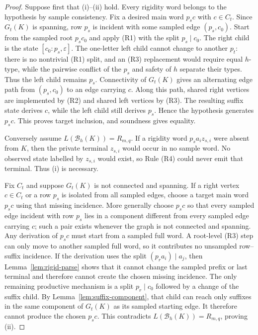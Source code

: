 \documentclass[11pt]{article}
\newcommand{\eps}{\varepsilon}
\newcommand{\B}{\mathcal B}
\begin{document}
\begin{proof}
Suppose first that (i)--(ii) hold.  Every rigidity word belongs to the
hypothesis by sample consistency.  Fix a desired main word $p_sc$ with
$c\in C_t$.  Since $G_t(K)$ is spanning, row $p_s$ is incident with some
sampled edge $(p_s,c_0)$.  Start from the sampled root $p_sc_0$ and apply
(R1) with the split $p_s\mid c_0$.  The right child is the state
$[c_0:p_s,\eps]$.  The one-letter left child cannot change to another $p_t$:
there is no nontrivial (R1) split, and an (R3) replacement would require equal
$h$-type, while the pairwise conflict of the $p_s$ and safety of $h$ separate
their types.  Thus the left child remains $p_s$.  Connectivity of $G_t(K)$ gives an alternating edge path
from $(p_s,c_0)$ to an edge carrying $c$.  Along this path, shared right
vertices are implemented by (R2) and shared left vertices by (R3).  The
resulting suffix state derives $c$, while the left child still derives $p_s$.
Hence the hypothesis generates $p_sc$.  This proves target inclusion, and
soundness gives equality.

Conversely assume $L(\B_h(K))=R_{m,q}$.  If a rigidity word
$p_sa_i z_{s,i}$ were absent from $K$, then the private terminal $z_{s,i}$
would occur in no sample word.  No observed state labelled by $z_{s,i}$ would
exist, so Rule (R4) could never emit that terminal.  Thus (i) is necessary.

Fix $C_t$ and suppose $G_t(K)$ is not connected and spanning.  If a right
vertex $c\in C_t$ or a row $p_s$ is isolated from all sampled edges, choose a
target main word $p_sc$ using that missing incidence.  More generally choose
$p_sc$ so that every sampled edge incident with row $p_s$ lies in a component
different from every sampled edge carrying $c$; such a pair exists whenever
the graph is not connected and spanning.  Any derivation of $p_sc$ must start
from a sampled full word.  A root-level (R3) step can only move to another
sampled full word, so it contributes no unsampled row--suffix incidence.
If the derivation uses the split $(p_ra_i)\mid a_j$, then
Lemma~\ref{lem:rigid-parse} shows that it cannot change the sampled prefix or
last terminal and therefore cannot create the chosen missing incidence.  The
only remaining productive mechanism is a split $p_r\mid c_0$ followed by a
change of the suffix child.  By Lemma~\ref{lem:suffix-component}, that child
can reach only suffixes in the same component of $G_t(K)$ as its sampled
starting edge.  It therefore cannot produce the chosen $p_sc$.  This
contradicts $L(\B_h(K))=R_{m,q}$, proving (ii).
\end{proof}
\end{document}
